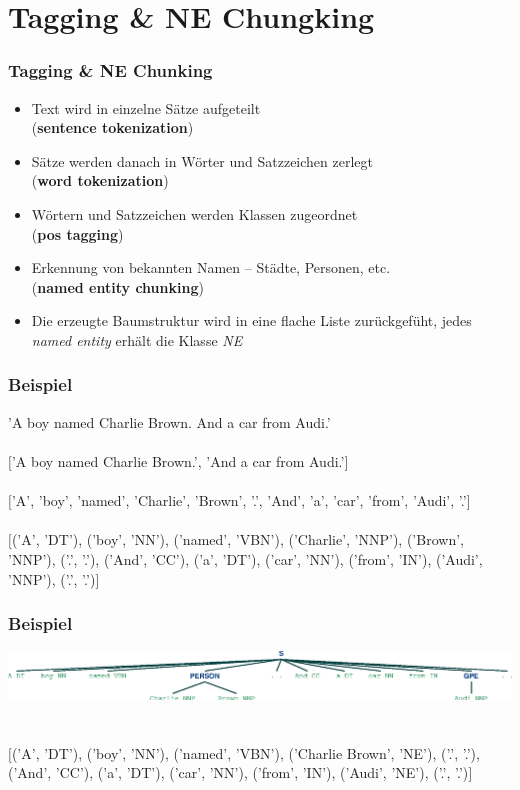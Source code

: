 \section{Tagging \& NE Chungking}

\begin{frame}
  \frametitle{Tagging \& NE Chunking}

  \begin{itemize}
  \item Text wird in einzelne Sätze aufgeteilt\\(\textbf{sentence tokenization})
  \item Sätze werden danach in Wörter und Satzzeichen zerlegt\\(\textbf{word tokenization})
  \item Wörtern und Satzzeichen werden Klassen zugeordnet\\(\textbf{pos
    tagging})
  \item Erkennung von bekannten Namen -- Städte, Personen, etc.\\(\textbf{named
    entity chunking})
  \item Die erzeugte Baumstruktur wird in eine flache Liste
    zurückgefüht, jedes \textit{named entity} erhält die Klasse \textit{NE}
  \end{itemize}
\end{frame}

\begin{frame}
  \frametitle{Beispiel}
  
  'A boy named Charlie Brown. And a car from Audi.'
  ~\\~\\
  \ensuremath {[}'A boy named Charlie Brown.', 'And a car from
  Audi.'\ensuremath{]}
  ~\\~\\
  \ensuremath{[}'A', 'boy', 'named', 'Charlie', 'Brown', '.', 'And', 'a', 'car',
  'from', 'Audi', '.'\ensuremath{]}
  ~\\~\\
  \ensuremath{[}('A', 'DT'), ('boy', 'NN'), ('named', 'VBN'), ('Charlie', 'NNP'),
  ('Brown', 'NNP'), ('.', '.'), ('And', 'CC'), ('a', 'DT'), ('car',
  'NN'), ('from', 'IN'), ('Audi', 'NNP'), ('.', '.')\ensuremath{]}
\end{frame}

\begin{frame}
  \frametitle{Beispiel}

  \includegraphics[scale=0.45]{img/ne_chunk_tree}
  ~\\~\\
  \ensuremath{[}('A', 'DT'), ('boy', 'NN'), ('named', 'VBN'),
  ('Charlie Brown', 'NE'), ('.', '.'), ('And', 'CC'), ('a', 'DT'),
  ('car', 'NN'), ('from', 'IN'), ('Audi', 'NE'), ('.', '.')\ensuremath{]}
\end{frame}

